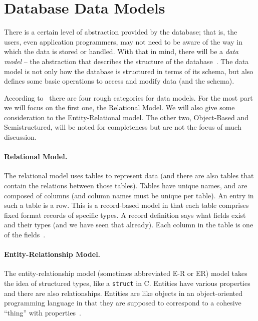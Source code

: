 




\section*{Database Data Models} 
There is a certain level of abstraction provided by the database; that is, the users, even application programmers, may not need to be aware of the way in which the data is stored or handled. With that in mind, there will be a \textit{data model} -- the abstraction that describes the structure of the database~\cite{fds}. The data model is not only how the database is structured in terms of its schema, but also defines some basic operations to access and modify data (and the schema). 

According to~\cite{dsc} there are four rough categories for data models. For the most part we will focus on the first one, the Relational Model. We will also give some consideration to the Entity-Relational model. The other two, Object-Based and Semistructured, will be noted for completeness but are not the focus of much discussion.


\paragraph{Relational Model.} The relational model uses tables to represent data (and there are also tables that contain the relations between those tables). Tables have unique names, and are composed of columns (and column names must be unique per table). An entry in such a table is a row. This is a record-based model in that each table comprises fixed format records of specific types. A record definition says what fields exist and their types (and we have seen that already). Each column in the table is one of the fields~\cite{dsc}.


\paragraph{Entity-Relationship Model.} The entity-relationship model (sometimes abbreviated E-R or ER) model takes the idea of structured types, like a \texttt{struct} in C. Entities have various properties and there are also relationships. Entities are like objects in an object-oriented programming language in that they are supposed to correspond to a cohesive ``thing'' with properties~\cite{dsc}.

